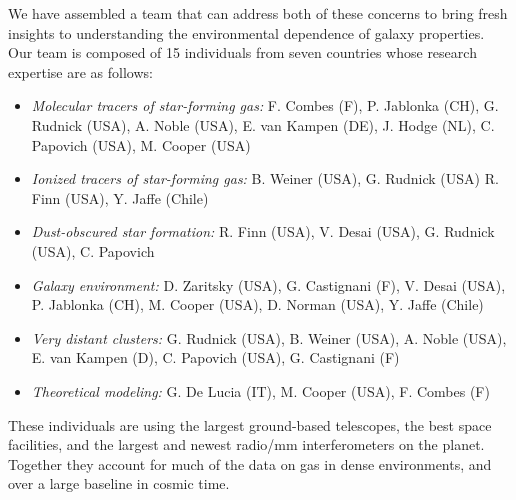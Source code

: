 \documentclass[11pt]{article}
\begin{document}

We have assembled a team that can address both of these concerns to bring fresh insights to understanding the environmental dependence of galaxy properties. Our team is composed of 15 individuals from seven countries whose research expertise are as follows:
\vspace{-0.15in}
\begin{itemize} 
\item \textit{Molecular tracers of star-forming gas:} F. Combes (F), P. Jablonka (CH), G. Rudnick (USA),
A. Noble (USA), E. van Kampen (DE), J. Hodge (NL), C. Papovich (USA), M. Cooper (USA)
\vspace{-0.1in}
\item \textit{Ionized tracers of star-forming gas:} B. Weiner (USA), G. Rudnick (USA) R. Finn (USA), Y. Jaffe (Chile) 
\vspace{-0.1in}
\item \textit{Dust-obscured star formation:} R. Finn (USA), V. Desai (USA), G. Rudnick (USA), C. Papovich
\vspace{-0.1in}
\item \textit{Galaxy environment:} D. Zaritsky (USA), G. Castignani (F), V. Desai (USA), P. Jablonka (CH), M. Cooper (USA), D. Norman (USA), Y. Jaffe (Chile)
\vspace{-0.1in}
\item \textit{Very distant clusters:} G. Rudnick (USA), B. Weiner (USA), A. Noble (USA), E. van Kampen (D), C. Papovich (USA), G. Castignani (F) 
\vspace{-0.1in}
\item \textit{Theoretical modeling:} G. De Lucia (IT), M. Cooper (USA), F. Combes (F)
\end{itemize}
\vspace{-0.15in}
These individuals are using the largest ground-based telescopes, the best space facilities, and the largest and newest radio/mm interferometers on the planet.  Together they account for much of the data on gas in dense environments, and over a large baseline in cosmic time.  
\end{document}
